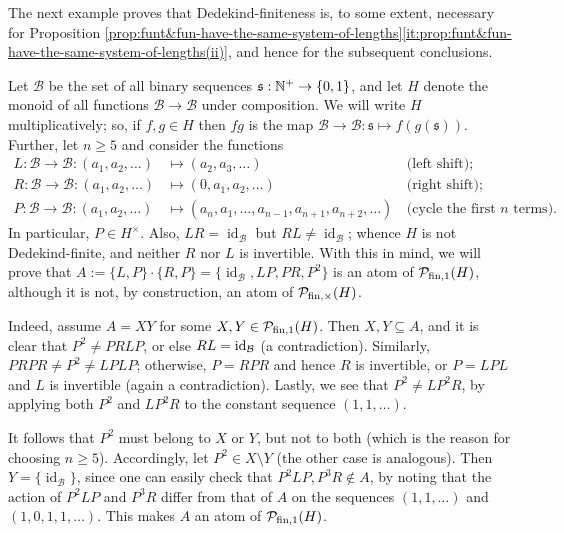 %
The next example proves that Dedekind-finiteness is, to some extent, necessary for Proposition \ref{prop:funt&fun-have-the-same-system-of-lengths}\ref{it:prop:funt&fun-have-the-same-system-of-lengths(ii)}, and hence for the subsequent conclusions. 
%
\begin{eg}\label{exa:no-dedekind-finiteness}
Let $\mathcal{B}$ be the set of all binary sequences $\mathfrak{s}: \mathbb{N}^+ \to \{0,1\}$, and let $H$ denote the monoid of all functions $\mathcal{B} \to \mathcal{B}$ under composition.  We will write $H$ multiplicatively; so, if $f, g \in H$ then $fg$ is the map $\mathcal{B} \to \mathcal{B}: \mathfrak{s} \mapsto f(g(\mathfrak s))$.
Further, let $n\ge 5$ and consider the functions 
\begin{align*}
L: \mathcal{B} \to\mathcal{B}: (a_1,a_2,\dots) &\mapsto (a_2,a_3,\dots)  &\,\textrm{(left shift);}\\
R: \mathcal{B} \to\mathcal{B}: (a_1,a_2,\dots) &\mapsto (0,a_1,a_2,\dots) &\,\textrm{(right shift);}\\
P: \mathcal{B} \to\mathcal{B}: (a_1,a_2,\dots) &\mapsto (a_{n},a_1,\dots, a_{n-1}, {a_{n+1}, a_{n+2}},\ldots) &\,\textrm{(cycle the first $n$ terms).}
\end{align*}
%
In particular, $P \in H^\times$. Also, $LR = \operatorname{id}_\mathcal{B}$ but $RL \neq \operatorname{id}_\mathcal{B}$; whence $H$ is not Dedekind-finite, and neither $R$ nor $L$ is invertible. With this in mind, we will prove that $A:= \{L,P\} \cdot \{R,P\} = \{\operatorname{id}_\mathcal{B}, LP, PR, P^2 \}$ is an atom of $\mathcal{P}_{\textrm{fin}, 1}(H)$, although it is not, by construction, an atom of $\mathcal{P}_{\textrm{fin}, \times}(H)$.

Indeed,
assume $A = XY$ for some $X,Y\in \mathcal{P}_{\textrm{fin}, 1}(H)$.
Then $X,Y\subseteq A$, and it is clear that $P^2 \ne PRLP$, or else $RL = {\rm id}_\mathcal{B}$ (a contradiction). Similarly, $PRPR \ne P^2 \ne LPLP$; otherwise, $P = RPR$ and hence $R$ is invertible, or $P = LPL$ and $L$ is invertible (again a contradiction). Lastly, we see that $P^2 \ne LP^2 R$, by applying both $P^2$ and $LP^2 R$ to the constant sequence $(1, 1, \ldots)$.

It follows that $P^2$ must belong to $X$ or $Y$, but not to both (which is the reason for choosing $n\ge 5$).
Accordingly, let $P^2 \in X \setminus Y$ (the other case is analogous).
Then $Y = \{\operatorname{id}_\mathcal{B}\}$, since one can easily check that $P^2LP, P^3R \notin A$, by noting that the action of $P^2LP$ and $P^3R$ differ from that of $A$ on the sequences $(1,1,\ldots)$ and $(1,0,1,1,\ldots)$. This makes $A$ an atom of $\mathcal{P}_{\textrm{fin}, 1}(H)$.
\end{eg}
